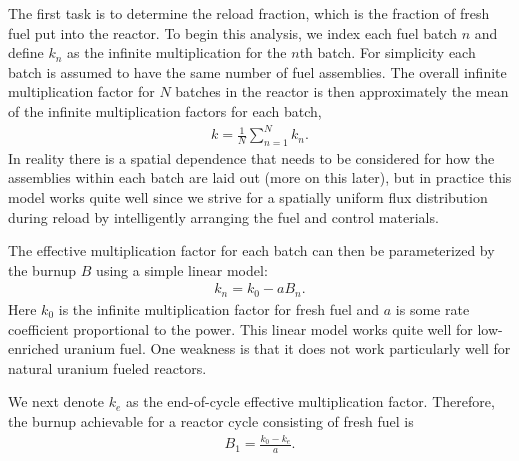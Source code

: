 The first task is to determine the reload fraction, which is the fraction of fresh fuel put into the reactor. To begin this analysis, we index each fuel batch $n$ and define $k_n$ as the infinite multiplication for the $n$th batch. For simplicity each batch is assumed to have the same number of fuel assemblies. The overall infinite multiplication factor for $N$ batches in the reactor is then approximately the mean of the infinite multiplication factors for each batch,
\begin{align}
  k = \frac{1}{N} \sum_{n=1}^N k_n .
\end{align}
In reality there is a spatial dependence that needs to be considered for how the assemblies within each batch are laid out (more on this later), but in practice this model works quite well since we strive for a spatially uniform flux distribution during reload by intelligently arranging the fuel and control materials.

The effective multiplication factor for each batch can then be parameterized by the burnup $B$ using a simple linear model:
\begin{align}
  k_n = k_0 - a B_n .
\end{align}
Here $k_0$ is the infinite multiplication factor for fresh fuel and $a$ is some rate coefficient proportional to the power. This linear model works quite well for low-enriched uranium fuel. One weakness is that it does not work particularly well for natural uranium fueled reactors.

We next denote $k_e$ as the end-of-cycle effective multiplication factor. Therefore, the burnup achievable for a reactor cycle consisting of fresh fuel is
\begin{align}
  B_1 = \frac{k_0 - k_e}{a} . \label{Eq:kinetics_fuelReload_burnupSingleCycle}
\end{align}

